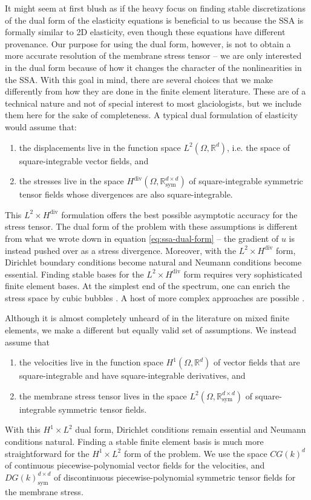 \documentclass[review,oneside]{igs}
\begin{document}
It might seem at first blush as if the heavy focus on finding stable discretizations of the dual form of the elasticity equations is beneficial to us because the SSA is formally similar to 2D elasticity, even though these equations have different provenance.
Our purpose for using the dual form, however, is not to obtain a more accurate resolution of the membrane stress tensor -- we are only interested in the dual form because of how it changes the character of the nonlinearities in the SSA.
With this goal in mind, there are several choices that we make differently from how they are done in the finite element literature.
These are of a technical nature and not of special interest to most glaciologists, but we include them here for the sake of completeness.
A typical dual formulation of elasticity would assume that:
\begin{enumerate}
    \item the displacements live in the function space $L^2(\Omega, \mathbb{R}^d)$, i.e. the space of square-integrable vector fields, and
    \item the stresses live in the space $H^{\text{div}}(\Omega, \mathbb{R}_{\text{sym}}^{d \times d})$ of square-integrable symmetric tensor fields whose divergences are also square-integrable.
\end{enumerate}
This $L^2 \times H^{\text{div}}$ formulation offers the best possible asymptotic accuracy for the stress tensor.
The dual form of the problem with these assumptions is different from what we wrote down in equation \eqref{eq:ssa-dual-form} -- the gradient of $u$ is instead pushed over as a stress divergence.
Moreover, with the $L^2 \times H^{\text{div}}$ form, Dirichlet boundary conditions become natural and Neumann conditions become essential.
Finding stable bases for the $L^2\times H^{\text{div}}$ form requires very sophisticated finite element bases.
At the simplest end of the spectrum, one can enrich the stress space by cubic bubbles \citep{brezzi1993mixed}.
A host of more complex approaches are possible \citep{arnold1984peers, arnold2002mixed}.

Although it is almost completely unheard of in the literature on mixed finite elements, we make a different but equally valid set of assumptions.
We instead assume that
\begin{enumerate}
    \item the velocities live in the function space $H^1(\Omega, \mathbb{R}^d)$ of vector fields that are square-integrable and have square-integrable derivatives, and
    \item the membrane stress tensor lives in the space $L^2(\Omega, \mathbb{R}^{d \times d}_{\text{sym}})$ of square-integrable symmetric tensor fields.
\end{enumerate}
With this $H^1 \times L^2$ dual form, Dirichlet conditions remain essential and Neumann conditions natural.
Finding a stable finite element basis is much more straightforward for the $H^1\times L^2$ form of the problem.
We use the space $CG(k)^d$ of continuous piecewise-polynomial vector fields for the velocities, and $DG(k)^{d\times d}_{\text{sym}}$ of discontinuous piecewise-polynomial symmetric tensor fields for the membrane stress.
\end{document}
